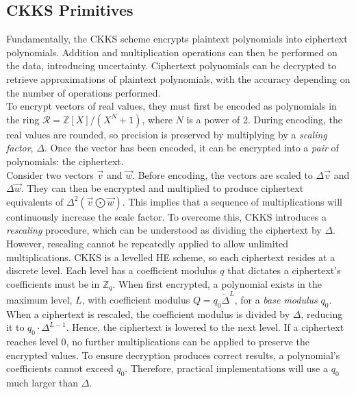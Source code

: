 \subsection{CKKS Primitives}
\label{sec:CKKS}
\indent \indent
Fundamentally, the CKKS scheme encrypts plaintext polynomials into ciphertext polynomials. Addition and multiplication operations can then be performed on the data, introducing uncertainty. Ciphertext polynomials can be decrypted to retrieve approximations of plaintext polynomials, with the accuracy depending on the number of operations performed.
\smallskip \\ \indent
To encrypt vectors of real values, they must first be encoded as polynomials in the ring $\mathcal{R} = \mathbb{Z}[X] / (X^N + 1)$, where $N$ is a power of 2. During encoding, the real values are rounded, so precision is preserved by multiplying by a \textit{scaling factor}, $\Delta$. Once the vector has been encoded, it can be encrypted into a \textit{pair} of polynomials: the ciphertext.
\smallskip \\ \indent
Consider two vectors $\vec{v}$ and $\vec{w}$. Before encoding, the vectors are scaled to $\Delta \vec{v}$ and $\Delta \vec{w}$.  They can then be encrypted and multiplied to produce ciphertext equivalents of $\Delta^2 (\vec{v} \bigodot \vec{w})$. This implies that a sequence of multiplications will continuously increase the scale factor. To overcome this, CKKS introduces a \textit{rescaling} procedure, which can be understood as dividing the ciphertext by $\Delta$.
\smallskip \\ \indent
However, rescaling cannot be repeatedly applied to allow unlimited multiplications. CKKS is a levelled HE scheme, so each ciphertext resides at a discrete level. Each level has a coefficient modulus $q$ that dictates a ciphertext's coefficients must be in $\mathbb{Z}_q$. When first encrypted, a polynomial exists in the maximum level, $L$, with coefficient modulus $Q = q_0 \dot \Delta^L$, for a \textit{base modulus} $q_0$. When a ciphertext is rescaled, the coefficient modulus is divided by $\Delta$, reducing it to $q_0 \cdot \Delta^{L-1}$. Hence, the ciphertext is lowered to the next level. If a ciphertext reaches level 0, no further multiplications can be applied to preserve the encrypted values. To ensure decryption produces correct results, a polynomial's coefficients cannot exceed $q_0$. Therefore, practical implementations will use a $q_0$ much larger than $\Delta$.


